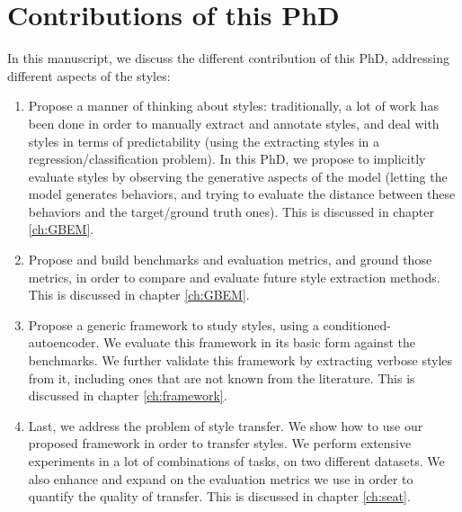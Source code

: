 \section{Contributions of this PhD}
\par In this manuscript, we discuss the different contribution of this PhD, addressing different aspects of the styles:
\begin{enumerate}
  \item Propose a manner of thinking about styles: traditionally, a lot of work has been done in order to manually extract and annotate styles, and deal with styles in terms of predictability (using the extracting styles in a regression/classification problem). In this PhD, we propose to implicitly evaluate styles by observing the generative aspects of the model (letting the model generates behaviors, and trying to evaluate the distance between these behaviors and the target/ground truth ones). This is discussed in chapter \ref{ch:GBEM}.
  \item Propose and build benchmarks and evaluation metrics, and ground those metrics, in order to compare and evaluate future style extraction methods. This is discussed in chapter \ref{ch:GBEM}.
  \item Propose a generic framework to study styles, using a conditioned-autoencoder. We evaluate this framework in its basic form against the benchmarks. We further validate this framework by extracting verbose styles from it, including ones that are not known from the literature. This is discussed in chapter \ref{ch:framework}.
  \item Last, we address the problem of style transfer. We show how to use our proposed framework in order to transfer styles. We perform extensive experiments in a lot of combinations of tasks, on two different datasets. We also enhance and expand on the evaluation metrics we use in order to quantify the quality of transfer. This is discussed in chapter \ref{ch:seat}.
\end{enumerate}

